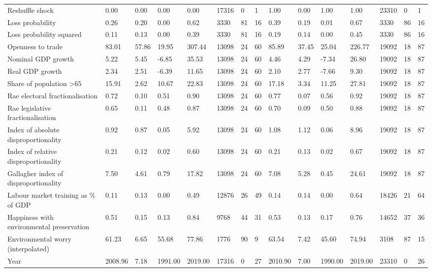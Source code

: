 \begin{longtable}{lllllllllllllll}
Reshuffle shock & 0.00 & 0.00 & 0.00 & 0.00 & 17316 & 0 & 1 & 1.00 & 0.00 & 1.00 & 1.00 & 23310 & 0 & 1\\
Loss probability & 0.26 & 0.20 & 0.00 & 0.62 & 3330 & 81 & 16 & 0.39 & 0.19 & 0.01 & 0.67 & 3330 & 86 & 16\\
\addlinespace
Loss probability squared & 0.11 & 0.13 & 0.00 & 0.39 & 3330 & 81 & 16 & 0.19 & 0.14 & 0.00 & 0.45 & 3330 & 86 & 16\\
Openness to trade & 83.01 & 57.86 & 19.95 & 307.44 & 13098 & 24 & 60 & 85.89 & 37.45 & 25.04 & 226.77 & 19092 & 18 & 87\\
Nominal GDP growth & 5.22 & 5.45 & -6.85 & 35.53 & 13098 & 24 & 60 & 4.46 & 4.29 & -7.34 & 26.80 & 19092 & 18 & 87\\
Real GDP growth & 2.34 & 2.51 & -6.39 & 11.65 & 13098 & 24 & 60 & 2.10 & 2.77 & -7.66 & 9.30 & 19092 & 18 & 87\\
Share of population >65 & 15.91 & 2.62 & 10.67 & 22.83 & 13098 & 24 & 60 & 17.18 & 3.34 & 11.25 & 27.81 & 19092 & 18 & 87\\
\addlinespace
Rae electoral fractionalisation & 0.72 & 0.10 & 0.51 & 0.90 & 13098 & 24 & 60 & 0.77 & 0.07 & 0.56 & 0.92 & 19092 & 18 & 87\\
Rae legislative fractionalisation & 0.65 & 0.11 & 0.48 & 0.87 & 13098 & 24 & 60 & 0.70 & 0.09 & 0.50 & 0.88 & 19092 & 18 & 87\\
Index of absolute disproportionality & 0.92 & 0.87 & 0.05 & 5.92 & 13098 & 24 & 60 & 1.08 & 1.12 & 0.06 & 8.96 & 19092 & 18 & 87\\
Index of relative disproportionality & 0.21 & 0.12 & 0.02 & 0.60 & 13098 & 24 & 60 & 0.21 & 0.13 & 0.02 & 0.67 & 19092 & 18 & 87\\
Gallagher index of disproportionality & 7.50 & 4.61 & 0.79 & 17.82 & 13098 & 24 & 60 & 7.08 & 5.28 & 0.45 & 24.61 & 19092 & 18 & 87\\
\addlinespace
Labour market training as \% of GDP & 0.11 & 0.13 & 0.00 & 0.49 & 12876 & 26 & 49 & 0.14 & 0.14 & 0.00 & 0.64 & 18426 & 21 & 64\\
Happiness with environmental preservation & 0.51 & 0.15 & 0.13 & 0.84 & 9768 & 44 & 31 & 0.53 & 0.13 & 0.17 & 0.76 & 14652 & 37 & 36\\
Environmental worry (interpolated) & 61.23 & 6.65 & 55.68 & 77.86 & 1776 & 90 & 9 & 63.54 & 7.42 & 45.60 & 74.94 & 3108 & 87 & 15\\
Year & 2008.96 & 7.18 & 1991.00 & 2019.00 & 17316 & 0 & 27 & 2010.90 & 7.00 & 1990.00 & 2019.00 & 23310 & 0 & 26\\
\bottomrule
\end{longtable}
